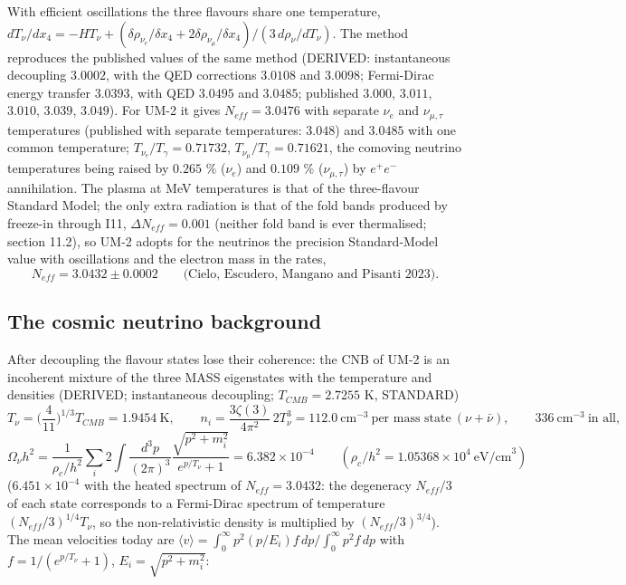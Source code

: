 \documentclass[
  10pt,
]{article}
\begin{document}
With efficient oscillations the three flavours share one temperature,
\(dT_\nu/dx_4 = -HT_\nu + (\delta\rho_{\nu_e}/\delta x_4 + 2\delta\rho_{\nu_\mu}/\delta x_4)/(3\,d\rho_\nu/dT_\nu)\).
The method reproduces the published values of the same method (DERIVED:
instantaneous decoupling \(3.0002\), with the QED corrections \(3.0108\)
and \(3.0098\); Fermi-Dirac energy transfer \(3.0393\), with QED
\(3.0495\) and \(3.0485\); published \(3.000\), \(3.011\), \(3.010\),
\(3.039\), \(3.049\)). For UM-2 it gives \(N_{eff} = 3.0476\) with
separate \(\nu_e\) and \(\nu_{\mu,\tau}\) temperatures (published with
separate temperatures: \(3.048\)) and \(3.0485\) with one common
temperature; \(T_{\nu_e}/T_\gamma = 0.71732\),
\(T_{\nu_\mu}/T_\gamma = 0.71621\), the comoving neutrino temperatures
being raised by \(0.265\) \% (\(\nu_e\)) and \(0.109\) \%
(\(\nu_{\mu,\tau}\)) by \(e^+e^-\) annihilation. The plasma at MeV
temperatures is that of the three-flavour Standard Model; the only extra
radiation is that of the fold bands produced by freeze-in through I11,
\(\Delta N_{eff} = 0.001\) (neither fold band is ever thermalised;
section 11.2), so UM-2 adopts for the neutrinos the precision
Standard-Model value with oscillations and the electron mass in the
rates,
\[ N_{eff} = 3.0432 \pm 0.0002 \qquad \text{(Cielo, Escudero, Mangano and Pisanti 2023)}. \]

\hypertarget{the-cosmic-neutrino-background}{%
\subsection{The cosmic neutrino
background}\label{the-cosmic-neutrino-background}}

After decoupling the flavour states lose their coherence: the CNB of
UM-2 is an incoherent mixture of the three MASS eigenstates with the
temperature and densities (DERIVED; instantaneous decoupling;
\(T_{CMB} = 2.7255\) K, STANDARD)
\[ T_\nu = \Big(\frac{4}{11}\Big)^{1/3}T_{CMB} = 1.9454\ \text{K},\qquad n_i = \frac{3\zeta(3)}{4\pi^2}\,2T_\nu^3 = 112.0\ \text{cm}^{-3}\ \text{per mass state}\ (\nu + \bar\nu),\qquad 336\ \text{cm}^{-3}\ \text{in all}, \]
\[ \Omega_\nu h^2 = \frac{1}{\rho_c/h^2}\sum_i 2\int\frac{d^3p}{(2\pi)^3}\frac{\sqrt{p^2 + m_i^2}}{e^{p/T_\nu} + 1} = 6.382\times10^{-4}\qquad (\rho_c/h^2 = 1.05368\times10^4\ \text{eV/cm}^3) \]
(\(6.451\times10^{-4}\) with the heated spectrum of
\(N_{eff} = 3.0432\): the degeneracy \(N_{eff}/3\) of each state
corresponds to a Fermi-Dirac spectrum of temperature
\((N_{eff}/3)^{1/4}T_\nu\), so the non-relativistic density is
multiplied by \((N_{eff}/3)^{3/4}\)). The mean velocities today are
\(\langle v\rangle = \int_0^\infty p^2(p/E_i)f\,dp/\int_0^\infty p^2f\,dp\)
with \(f = 1/(e^{p/T_\nu} + 1)\), \(E_i = \sqrt{p^2 + m_i^2}\):
\end{document}
